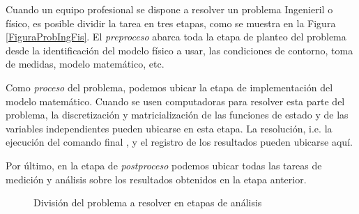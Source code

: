Cuando un equipo profesional se dispone a resolver 
un problema Ingenieril o físico, es posible dividir la 
tarea en tres etapas, como se muestra en la Figura 
\autoref{FiguraProbIngFis}.  
El \emph{preproceso} 
abarca toda la etapa de planteo del problema
desde la identificación del modelo físico a 
usar, las condiciones de contorno, toma de 
medidas, modelo matemático, etc. 

Como \emph{proceso} del problema, podemos ubicar
la etapa de implementación del modelo
matemático. Cuando se usen computadoras
para resolver esta parte del problema,
la discretización y matricialización de 
las funciones de estado y de las variables
independientes pueden ubicarse en esta 
etapa. La resolución, i.e. la ejecución
del comando final , y el registro de los
resultados pueden ubicarse aquí.

Por último, en la etapa de 
\emph{postproceso} podemos ubicar todas
las tareas de medición y análisis sobre 
los resultados obtenidos en la etapa
anterior. 

 \begin{figure}
  \caption{División del problema a resolver en etapas de análisis \label{FiguraProbIngFis}}

\end{figure}


\mode*

